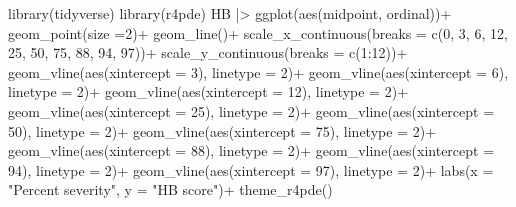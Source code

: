 \documentclass[
  letterpaper,
]{book}
\newenvironment{Shaded}{\begin{snugshade}}{\end{snugshade}}
\newcommand{\AttributeTok}[1]{\textcolor[rgb]{0.40,0.45,0.13}{#1}}
\newcommand{\DecValTok}[1]{\textcolor[rgb]{0.68,0.00,0.00}{#1}}
\newcommand{\FunctionTok}[1]{\textcolor[rgb]{0.28,0.35,0.67}{#1}}
\newcommand{\NormalTok}[1]{\textcolor[rgb]{0.00,0.23,0.31}{#1}}
\newcommand{\SpecialCharTok}[1]{\textcolor[rgb]{0.37,0.37,0.37}{#1}}
\newcommand{\StringTok}[1]{\textcolor[rgb]{0.13,0.47,0.30}{#1}}
\begin{document}
\begin{Shaded}
\begin{Highlighting}[]
\FunctionTok{library}\NormalTok{(tidyverse)}
\FunctionTok{library}\NormalTok{(r4pde)}
\NormalTok{HB }\SpecialCharTok{|\textgreater{}} 
  \FunctionTok{ggplot}\NormalTok{(}\FunctionTok{aes}\NormalTok{(midpoint, ordinal))}\SpecialCharTok{+}
  \FunctionTok{geom\_point}\NormalTok{(}\AttributeTok{size =}\DecValTok{2}\NormalTok{)}\SpecialCharTok{+}
  \FunctionTok{geom\_line}\NormalTok{()}\SpecialCharTok{+}
  \FunctionTok{scale\_x\_continuous}\NormalTok{(}\AttributeTok{breaks =} \FunctionTok{c}\NormalTok{(}\DecValTok{0}\NormalTok{, }\DecValTok{3}\NormalTok{, }\DecValTok{6}\NormalTok{, }\DecValTok{12}\NormalTok{, }\DecValTok{25}\NormalTok{, }\DecValTok{50}\NormalTok{, }\DecValTok{75}\NormalTok{, }\DecValTok{88}\NormalTok{, }\DecValTok{94}\NormalTok{, }\DecValTok{97}\NormalTok{))}\SpecialCharTok{+}
  \FunctionTok{scale\_y\_continuous}\NormalTok{(}\AttributeTok{breaks =} \FunctionTok{c}\NormalTok{(}\DecValTok{1}\SpecialCharTok{:}\DecValTok{12}\NormalTok{))}\SpecialCharTok{+}
  \FunctionTok{geom\_vline}\NormalTok{(}\FunctionTok{aes}\NormalTok{(}\AttributeTok{xintercept =} \DecValTok{3}\NormalTok{), }\AttributeTok{linetype =} \DecValTok{2}\NormalTok{)}\SpecialCharTok{+}
  \FunctionTok{geom\_vline}\NormalTok{(}\FunctionTok{aes}\NormalTok{(}\AttributeTok{xintercept =} \DecValTok{6}\NormalTok{), }\AttributeTok{linetype =} \DecValTok{2}\NormalTok{)}\SpecialCharTok{+}
  \FunctionTok{geom\_vline}\NormalTok{(}\FunctionTok{aes}\NormalTok{(}\AttributeTok{xintercept =} \DecValTok{12}\NormalTok{), }\AttributeTok{linetype =} \DecValTok{2}\NormalTok{)}\SpecialCharTok{+}
  \FunctionTok{geom\_vline}\NormalTok{(}\FunctionTok{aes}\NormalTok{(}\AttributeTok{xintercept =} \DecValTok{25}\NormalTok{), }\AttributeTok{linetype =} \DecValTok{2}\NormalTok{)}\SpecialCharTok{+}
  \FunctionTok{geom\_vline}\NormalTok{(}\FunctionTok{aes}\NormalTok{(}\AttributeTok{xintercept =} \DecValTok{50}\NormalTok{), }\AttributeTok{linetype =} \DecValTok{2}\NormalTok{)}\SpecialCharTok{+}
  \FunctionTok{geom\_vline}\NormalTok{(}\FunctionTok{aes}\NormalTok{(}\AttributeTok{xintercept =} \DecValTok{75}\NormalTok{), }\AttributeTok{linetype =} \DecValTok{2}\NormalTok{)}\SpecialCharTok{+}
  \FunctionTok{geom\_vline}\NormalTok{(}\FunctionTok{aes}\NormalTok{(}\AttributeTok{xintercept =} \DecValTok{88}\NormalTok{), }\AttributeTok{linetype =} \DecValTok{2}\NormalTok{)}\SpecialCharTok{+}
  \FunctionTok{geom\_vline}\NormalTok{(}\FunctionTok{aes}\NormalTok{(}\AttributeTok{xintercept =} \DecValTok{94}\NormalTok{), }\AttributeTok{linetype =} \DecValTok{2}\NormalTok{)}\SpecialCharTok{+}
  \FunctionTok{geom\_vline}\NormalTok{(}\FunctionTok{aes}\NormalTok{(}\AttributeTok{xintercept =} \DecValTok{97}\NormalTok{), }\AttributeTok{linetype =} \DecValTok{2}\NormalTok{)}\SpecialCharTok{+}
  \FunctionTok{labs}\NormalTok{(}\AttributeTok{x =} \StringTok{"Percent severity"}\NormalTok{, }\AttributeTok{y =} \StringTok{"HB score"}\NormalTok{)}\SpecialCharTok{+}
  \FunctionTok{theme\_r4pde}\NormalTok{()}
\end{Highlighting}
\end{Shaded}
\end{document}

